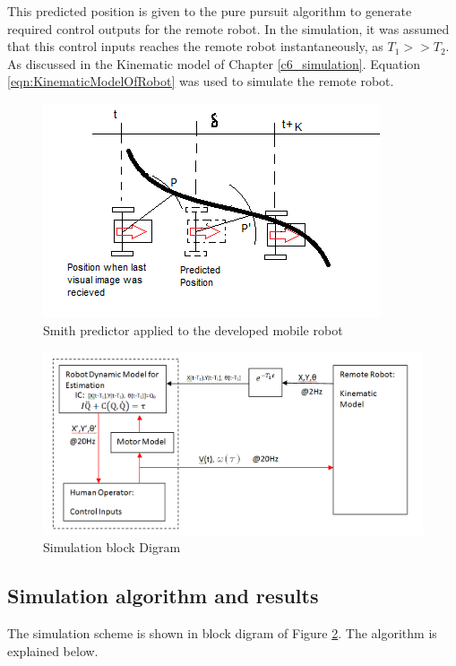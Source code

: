 This predicted position is given to the pure pursuit algorithm to generate required control outputs for the remote robot. In the simulation, it was assumed that this control inputs reaches the remote robot instantaneously, as $T_1>> T_2$. As discussed in the   Kinematic model of Chapter \ref{c6_simulation}. Equation \ref{eqn:KinematicModelOfRobot} was used to simulate the remote robot.
 \begin{figure}
	\includegraphics[width=.8\linewidth]{Chapter7/fig/robotPredictPos}
	\caption{Smith predictor applied to the developed mobile robot}
	\label{fig:SmithRobot}
\end{figure}
 \begin{figure}
	\includegraphics[width=\linewidth]{Chapter7/fig/Sumilation_BlkDgm}
	\caption{Simulation block Digram}
	\label{fig:SimBlock}
\end{figure}
\subsection{Simulation algorithm and  results} 
The simulation scheme is  shown in block digram of Figure \ref{fig:SimBlock}. The algorithm  is explained  below.

